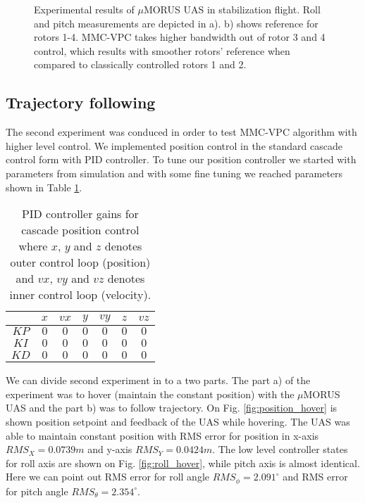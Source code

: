 \begin{figure}
  \centering
  \hfill
  \caption{Experimental results of $\mu$MORUS UAS in stabilization flight. Roll and pitch measurements are depicted in a). b) shows reference for rotors 1-4. MMC-VPC takes higher bandwidth out of rotor 3 and 4 control, which results with smoother rotors' reference when compared to classically controlled rotors 1 and 2.}
\end{figure}

\subsection{Trajectory following}

The second experiment was conduced in order to test MMC-VPC algorithm with higher level control. We implemented position control in the standard cascade control form with PID controller. To tune our position controller we started with parameters from simulation and with some fine tuning we reached parameters shown in Table \ref{table:position_control_params}. 

\begin{table}[h!]
\centering
\caption{PID controller gains for cascade position control where $x$, $y$ and $z$ denotes outer control loop (position) and $vx$, $vy$ and $vz$ denotes inner control loop (velocity).}
\label{table:position_control_params}
\begin{tabular}{|c|c|c|c|c|c|c|}
\hline
 & $x$ & $vx$ & $y$ & $vy$ & $z$ & $vz$\\
\hline
$KP$ & $0$ & $0$ & $0$ & $0$ & $0$ & $0$\\
\hline
$KI$ & $0$ & $0$ & $0$ & $0$ & $0$ & $0$\\
\hline
$KD$ & $0$ & $0$ & $0$ & $0$ & $0$ & $0$\\
\hline
\end{tabular}
\end{table}

We can divide second experiment in to a two parts. The part a) of the experiment was to hover (maintain the constant position) with the $\mu$MORUS UAS and the part b) was to follow trajectory. On Fig. \ref{fig:position_hover} is shown position setpoint and feedback of the UAS while hovering. The UAS was able to maintain constant position with RMS error for position in x-axis $RMS_X = 0.0739 m$ and y-axis $RMS_Y = 0.0424 m$. The low level controller states for roll axis are shown on Fig. \ref{fig:roll_hover}, while pitch axis is almost identical. Here we can point out RMS error for roll angle $RMS_\phi = 2.091^{\circ}$ and RMS error for pitch angle $RMS_\theta = 2.354^{\circ}$.


